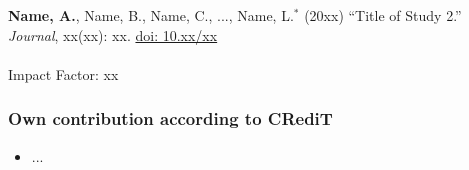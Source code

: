 \documentclass[float=true, crop=false]{standalone}
\begin{document}
\textbf{Name, A.}, Name, B., Name, C., ..., Name, L.$^{*}$ (20xx) \enquote{Title of Study 2.} \textit{Journal}, xx(xx): xx. \href{https://doi.org/10.xx/xx}{doi: 10.xx/xx}\\
\\
Impact Factor: xx\\

\subsubsection*{Own contribution according to CRediT}
\begin{itemize}
    \item ...
\end{itemize}
\end{document}
